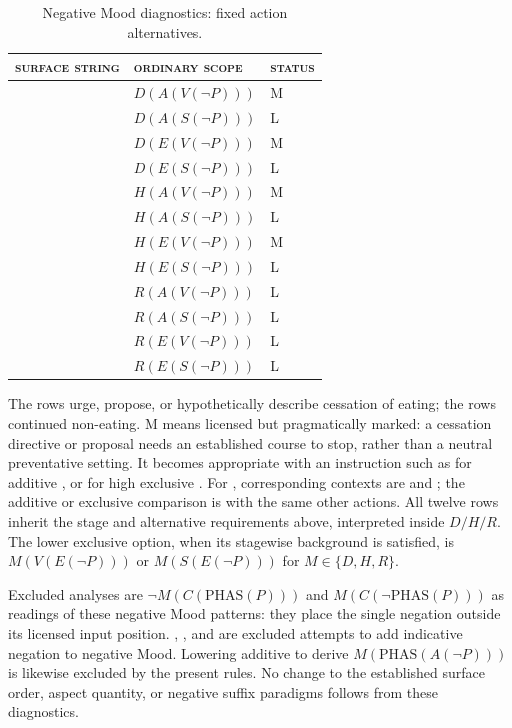 \begin{table}[ht]
\footnotesize
\caption{Negative Mood diagnostics: fixed action alternatives.}
\label{tab:th-negative-mood-diagnostics}
\begin{tabularx}{\textwidth}{L l l}
\toprule
\textsc{surface string} & \textsc{ordinary scope} & \textsc{status} \\
\midrule
{} & $D(A(V(\neg P)))$ & M \\
 & $D(A(S(\neg P)))$ & L \\
 & $D(E(V(\neg P)))$ & M \\
 & $D(E(S(\neg P)))$ & L \\
 & $H(A(V(\neg P)))$ & M \\
 & $H(A(S(\neg P)))$ & L \\
 & $H(E(V(\neg P)))$ & M \\
 & $H(E(S(\neg P)))$ & L \\
 & $R(A(V(\neg P)))$ & L \\
 & $R(A(S(\neg P)))$ & L \\
 & $R(E(V(\neg P)))$ & L \\
 & $R(E(S(\neg P)))$ & L \\
\bottomrule
\end{tabularx}
\end{table}

The  rows urge, propose, or hypothetically describe cessation of
eating; the  rows continued non-eating. M means licensed but
pragmatically marked: a cessation directive or proposal needs an established
course to stop, rather than a neutral preventative setting. It becomes
appropriate with an instruction such as 
for additive , or  for high exclusive . For , corresponding contexts
are  and ; the additive or exclusive comparison is with the same
other actions. All twelve rows inherit the stage and alternative requirements
above, interpreted inside $D/H/R$. The lower exclusive option, when its
stagewise background is satisfied, is $M(V(E(\neg P)))$ or
$M(S(E(\neg P)))$ for $M\in\{D,H,R\}$.

Excluded analyses are $\neg M(C(\mathrm{PHAS}(P)))$ and
$M(C(\neg\mathrm{PHAS}(P)))$ as readings of these negative Mood patterns:
they place the single negation outside its licensed input position.
, , and
 are excluded attempts to add indicative negation to
negative Mood. Lowering additive  to derive
$M(\mathrm{PHAS}(A(\neg P)))$ is likewise excluded by the present rules.
No change to the established surface order, aspect quantity, or negative
suffix paradigms follows from these diagnostics.

